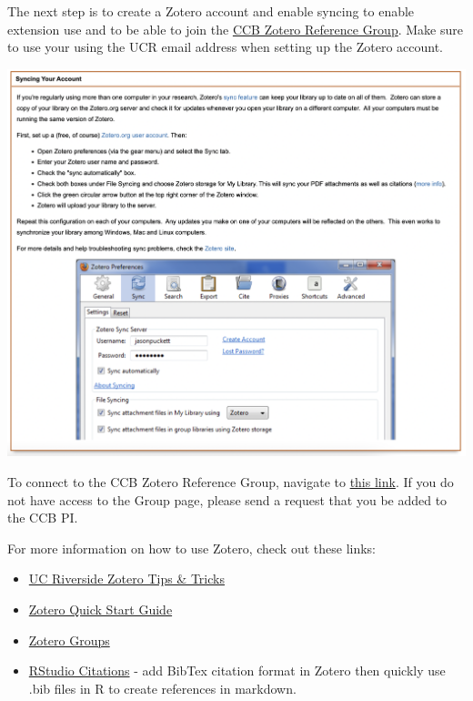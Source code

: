 \documentclass[
]{book}
\providecommand{\tightlist}{%
  \setlength{\itemsep}{0pt}\setlength{\parskip}{0pt}}
\begin{document}
The next step is to create a Zotero account and enable syncing to enable extension use and to be able to join the \href{https://www.zotero.org/groups/4734848/ccbucr}{CCB Zotero Reference Group}. Make sure to use your using the UCR email address when setting up the Zotero account.

\begin{center}\includegraphics{images/zoterosyncing} \end{center}

To connect to the CCB Zotero Reference Group, navigate to \href{https://www.zotero.org/groups/4734848/ccbucr}{this link}. If you do not have access to the Group page, please send a request that you be added to the CCB PI.

For more information on how to use Zotero, check out these links:

\begin{itemize}
\tightlist
\item
  \href{https://guides.lib.ucr.edu/c.php?g=171064\&p=1126842}{UC Riverside Zotero Tips \& Tricks}
\item
  \href{https://www.zotero.org/support/quick_start_guide}{Zotero Quick Start Guide}
\item
  \href{https://www.zotero.org/support/groups}{Zotero Groups}
\item
  \href{https://www.youtube.com/watch?v=zuuOYjE8m98}{RStudio Citations} - add BibTex citation format in Zotero then quickly use .bib files in R to create references in markdown.
\end{itemize}
\end{document}
